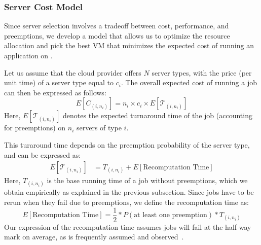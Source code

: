 \subsubsection{Server Cost Model}
\label{subsec:cost-model}

Since server selection involves a tradeoff between cost, performance, and preemptions, we develop a model that allows us to optimize the resource allocation and pick the best VM that minimizes the expected cost of running an application on \sysname. 




Let us assume that the cloud provider offers $N$ server types, with the price (per unit time) of a server type equal to $c_i$. 
The overall expected cost of running a job can then be expressed as follows:
\begin{equation}
  \label{eq:e-cost}
  E[C_{( i,n_i )}] = n_i\times c_i \times E[\mathcal{T}_{( i,n_i )}]
\end{equation}
Here, $E[\mathcal{T}_{( i,n_i )}]$ denotes the expected turnaround time of the job (accounting for preemptions) on $n_i$ servers of type $i$.

This turaround time depends on the preemption probability of the server type, and can be expressed as:
\begin{align}
  \label{eq:turnaround}
  E[\mathcal{T}_{( i,n_i )}] &= T_{( i,n_i )} + E[\text{Recomputation Time}]
\end{align}
Here, $T_{( i,n_i )}$ is the base running time of a job without preemptions, which we obtain empirically as explained in the previous subsection.
Since jobs have to be rerun when they fail due to preemptions, we define the recomputation time as:
\begin{equation}
  \label{eq:recomput}
   E[\text{Recomputation Time}] = \frac{1}{2}*P(\text{at least one preemption})* T_{( i,n_i )}   
 \end{equation}
Our expression of the recomputation time assumes jobs will fail at the half-way mark on average, as is frequently assumed and observed~\cite{daly2006higher, bougeret_checkpointing_2011}. 

